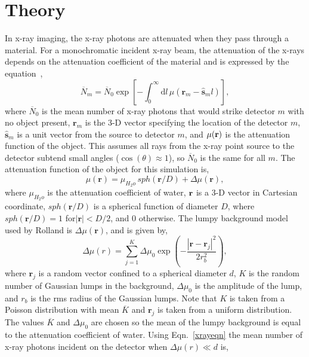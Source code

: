 \section{Theory}
In x-ray imaging, the x-ray photons are attenuated when they pass through a material.  For a monochromatic incident x-ray beam, the attenuation of the x-rays depends on the attenuation coefficient of the material and is expressed by the equation~\citep{Barrett2004},
%
\begin{equation}
\label{xrayeqn}
\overline{N}_m = \overline{N}_0 \exp\left[-\int_0^{\infty} \! \mathrm{d}l \,\mu(\mathbf{r}_{m}-\hat{\mathbf{s}}_m l )\right],
\end{equation}
%
where $\overline{N}_0$ is the mean number of x-ray photons that would strike detector $m$ with no object present, $\mathbf{r}_m$ is the 3-D vector specifying the location of the detector $m$, $\mathbf{\hat{s}}_m$ is a unit vector from the source to detector $m$, and $\mu(\bf{r})$ is the attenuation function of the object.  This assumes all rays from the x-ray point source to the detector subtend small angles ($\cos(\theta)\approx 1$), so $\overline{N}_0$ is the same for all $m$.  The attenuation function of the object for this simulation is,
%
\begin{equation}
\label{obj_eqn}
\mu({\mathbf{r}}) = \mu_{H_2o} \, sph(\mathbf{r}/D) + \Delta\mu({\mathbf{r}}), 
\end{equation}
%
where $\mu_{H_2o}$ is the attenuation coefficient of water, $\bf{r}$ is a 3-D vector in Cartesian coordinate, $sph(\textbf{r}/D)$ is a spherical function of diameter $D$, where $sph(\textbf{r}/D)=1$ for$|\textbf{r}|<D/2$, and $0$ otherwise.  The lumpy background model used by Rolland is $\Delta \mu(\textbf{r})$, and is given by,
%
\begin{equation}
\label{lumpy}
\Delta\mu(r) = \sum\limits_{j = 1}^{K}\Delta\mu_0 \exp\left(-\frac{|\mathbf{r}-\mathbf{r}_j|^2}{2r_b^2}   \right),
\end{equation}
%
where $\mathbf{r}_j$ is a random vector confined to a spherical diameter $d$, $K$ is the random number of Gaussian lumps in the background, $\Delta\mu_0$ is the amplitude of the lump, and $r_b$ is the rms radius of the Gaussian lumps.  Note that $K$ is taken from a Poisson distribution with mean $\overline{K}$ and $\mathbf{r}_j$ is taken from a uniform distribution.  The values $\overline{K}$ and $\Delta\mu_0$ are chosen so the mean of the lumpy background is equal to the attenuation coefficient of water.
%
Using Eqn.~\ref{xrayeqn} the mean number of x-ray photons incident on the detector when $\Delta\mu(r) \ll d$ is,
